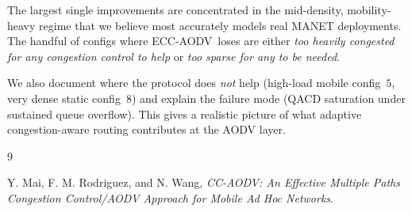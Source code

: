 \documentclass[11pt,a4paper]{article}
\newcommand{\ecc}{ECC-AODV}
\begin{document}
The largest single improvements are concentrated in the mid-density,
mobility-heavy regime that we believe most accurately models real MANET
deployments. The handful of configs where \ecc\ loses are either \emph{too
heavily congested for any congestion control to help} or \emph{too sparse for
any to be needed}.

We also document where the protocol does \emph{not} help (high-load mobile
config~$5$, very dense static config~$8$) and explain the failure mode (QACD
saturation under sustained queue overflow). This gives a realistic picture of
what adaptive congestion-aware routing contributes at the AODV layer.

\begin{thebibliography}{9}



Y. Mai, F. M. Rodriguez, and N. Wang,
    \textit{CC-AODV: An Effective Multiple Paths Congestion Control/AODV
Approach for Mobile Ad Hoc Networks}.



\end{thebibliography}
\end{document}
